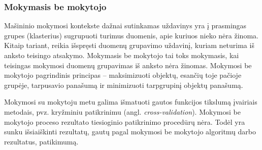 
\subsubsection{Mokymasis be mokytojo}

Mašininio mokymosi kontekste dažnai sutinkamas uždavinys yra į prasmingas grupes (klasterius) sugrupuoti turimus duomenis, apie kuriuos nieko nėra žinoma. Kitaip tariant, reikia išspręsti duomenų grupavimo uždavinį, kuriam neturima iš anksto teisingo atsakymo. Mokymasis be mokytojo tai toks mokymasis, kai teisingas mokymosi duomenų grupavimas iš anksto nėra žinomas. Mokymosi be mokytojo pagrindinis principas -- maksimizuoti objektų, esančių toje pačioje grupėje, tarpusavio panašumą ir minimizuoti tarpgrupinį objektų panašumą.

Mokymosi su mokytoju metu galima išmatuoti gautos funkcijos tikslumą įvairiais metodais, pvz. kryžminiu patikrinimu (angl. \textit{cross-validation}). Mokymosi be mokytojo proceso rezultato tiesioginio patikrinimo procedūrų nėra. Todėl yra sunku išsiaiškinti rezultatų, gautų pagal mokymosi be mokytojo algoritmų darbo rezultatus, patikimumą. 



